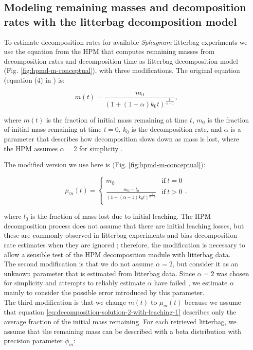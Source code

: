 \documentclass[esd, manuscript]{copernicus}
\begin{document}
\hypertarget{sdm-003-methods-3}{%
\subsection{Modeling remaining masses and decomposition rates with the litterbag decomposition model}\label{sdm-003-methods-3}}

To estimate decomposition rates for available \emph{Sphagnum} litterbag experiments we use the equation from the HPM that computes remaining masses from decomposition rates and decomposition time \citep{Frolking.2001, Frolking.2010} as litterbag decomposition model (Fig. \ref{fig:hpmd-m-conceptual}), with three modifications. The original equation (equation (4) in \citet{Frolking.2001}) is:

\begin{equation}
m(t) = \frac{m_0}{(1 + (1 + \alpha) k_0 t)^{\frac{1}{\alpha - 1}}},
\label{eq:hpm-remaining-mass-original}
\end{equation}

where \(m(t)\) is the fraction of initial mass remaining at time \(t\), \(m_0\) is the fraction of initial mass remaining at time \(t=0\), \(k_0\) is the decomposition rate, and \(\alpha\) is a parameter that describes how decomposition slows down as mass is lost, where the HPM assumes \(\alpha = 2\) for simplicity \citep{Frolking.2001, Frolking.2010}.

The modified version we use here is (Fig. \ref{fig:hpmd-m-conceptual}):

\begin{equation}
\mu_m(t) = \begin{cases}
m_0 & \mathrm{if}~t=0\\
\frac{m_0 - l_0}{(1 + (\alpha - 1) k_0 t)^{\frac{1}{\alpha - 1}}} &     \mathrm{if}~t>0\\
\end{cases}
\label{eq:decomposition-solution-2-with-leaching-1},
\end{equation}

where \(l_0\) is the fraction of mass lost due to initial leaching. The HPM decomposition process does not assume that there are initial leaching losses, but these are commonly observed in litterbag experiments and bias decomposition rate estimates when they are ignored \citep{Yu.2001, Teickner.2025}; therefore, the modification is necessary to allow a sensible test of the HPM decomposition module with litterbag data.\\
The second modification is that we do not assume \(\alpha=2\), but consider it as an unknown parameter that is estimated from litterbag data. Since \(\alpha=2\) was chosen for simplicity and attempts to reliably estimate \(\alpha\) have failed \citep[e.g.,][]{Clymo.1998, Frolking.2001, Teickner.2025}, we estimate \(\alpha\) mainly to consider the possible error introduced by this parameter.\\
The third modification is that we change \(m(t)\) to \(\mu_m(t)\) because we assume that equation \eqref{eq:decomposition-solution-2-with-leaching-1} describes only the average fraction of the initial mass remaining. For each retrieved litterbag, we assume that the remaining mass can be described with a beta distribution with precision parameter \(\phi_m\):
\end{document}

